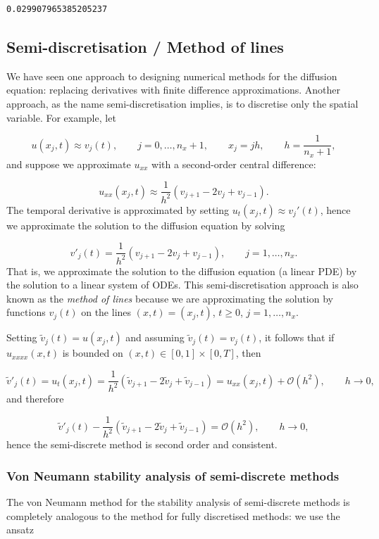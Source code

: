 \documentclass[12pt,a4paper]{article}
\begin{document}
\begin{lstlisting}
0.029907965385205237
\end{lstlisting}


\subsection{Semi-discretisation / Method of lines}
We have seen one approach to designing numerical methods for the diffusion equation: replacing derivatives with finite difference approximations.  Another approach, as the name semi-discretisation implies, is to discretise only the spatial variable.   For example, let

\[
u(x_j,t) \approx v_j(t), \qquad j  = 0, \ldots, n_x + 1, \qquad x_j = jh, \qquad h = \frac{1}{n_x + 1},
\]
and suppose we approximate $u_{xx}$ with a second-order central difference:

\[
u_{xx}(x_j,t) \approx  \frac{1}{h^2}\left(v_{j+1} - 2v_j + v_{j-1}   \right).
\]
The temporal derivative is approximated by setting $u_t(x_j,t) \approx v_j'(t)$,  hence we approximate the solution to the diffusion equation by solving

\[
v'_j(t) = \frac{1}{h^2}\left(v_{j+1} - 2v_j + v_{j-1}   \right), \qquad j  = 1, \ldots, n_x.
\]
That is, we approximate the solution to the diffusion equation (a linear PDE) by the solution to a linear system of ODEs.   This semi-discretisation approach is also known as the \emph{method of lines} because we are approximating the solution by functions $v_j(t)$ on the lines $(x,t) = (x_j,t)$, $t \geq 0$, $j = 1, \ldots, n_x$.

Setting $\tilde{v}_j(t) = u(x_j,t)$ and assuming $\tilde{v}_j(t) = v_j(t)$, it follows that if $u_{xxxx}(x,t)$ is bounded on $(x,t) \in [0,1]\times[0,T]$, then

\[
\tilde{v}'_j(t) = u_t(x_j,t) = \frac{1}{h^2}\left(\tilde{v}_{j+1} - 2\tilde{v}_j + \tilde{v}_{j-1}   \right) = u_{xx}(x_j,t) + \mathcal{O}(h^2), \qquad h \to 0,
\]
and therefore

\[
\tilde{v}'_j(t) - \frac{1}{h^2}\left(\tilde{v}_{j+1} - 2\tilde{v}_j + \tilde{v}_{j-1}   \right) = \mathcal{O}(h^2), \qquad h \to 0,
\]
hence the semi-discrete method is second order and consistent.

\subsubsection{Von Neumann stability analysis of semi-discrete methods}
The von Neumann method for the stability analysis of semi-discrete methods is completely analogous to the method for fully discretised methods: we use the ansatz
\end{document}
